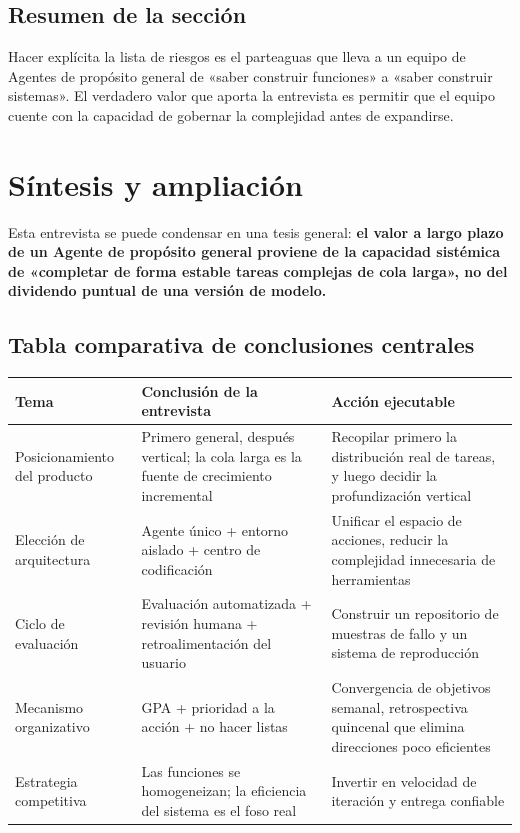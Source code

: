 \documentclass[a4paper]{article}
\begin{document}
\subsection{Resumen de la sección}

Hacer explícita la lista de riesgos es el parteaguas que lleva a un equipo de Agentes de propósito general de «saber construir funciones» a «saber construir sistemas». El verdadero valor que aporta la entrevista es permitir que el equipo cuente con la capacidad de gobernar la complejidad antes de expandirse.

\section{Síntesis y ampliación}

Esta entrevista se puede condensar en una tesis general: \textbf{el valor a largo plazo de un Agente de propósito general proviene de la capacidad sistémica de «completar de forma estable tareas complejas de cola larga», no del dividendo puntual de una versión de modelo.}

\subsection{Tabla comparativa de conclusiones centrales}

\begin{center}
\begin{tabular}{p{3.4cm}p{5.1cm}p{5.3cm}}
\toprule
Tema & Conclusión de la entrevista & Acción ejecutable \\
\midrule
Posicionamiento del producto & Primero general, después vertical; la cola larga es la fuente de crecimiento incremental & Recopilar primero la distribución real de tareas, y luego decidir la profundización vertical \\
Elección de arquitectura & Agente único + entorno aislado + centro de codificación & Unificar el espacio de acciones, reducir la complejidad innecesaria de herramientas \\
Ciclo de evaluación & Evaluación automatizada + revisión humana + retroalimentación del usuario & Construir un repositorio de muestras de fallo y un sistema de reproducción \\
Mecanismo organizativo & GPA + prioridad a la acción + no hacer listas & Convergencia de objetivos semanal, retrospectiva quincenal que elimina direcciones poco eficientes \\
Estrategia competitiva & Las funciones se homogeneizan; la eficiencia del sistema es el foso real & Invertir en velocidad de iteración y entrega confiable \\
\bottomrule
\end{tabular}
\end{center}
\end{document}
